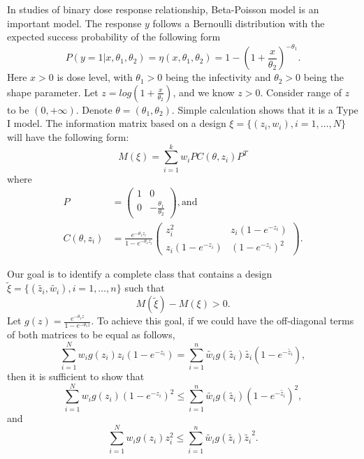 \documentclass[11pt]{amsart}
\theoremstyle{definition}
\theoremstyle{remark}
\numberwithin{equation}{section}
\begin{document}
In  studies of binary dose response relationship, Beta-Poisson model is an important model. The response $y$ follows a Bernoulli distribution with the expected success probability of the following form
\[
P(y=1|x,\theta_1,\theta_2) = \eta(x,\theta_1,\theta_2)= 1-(1+\frac{x}{\theta_2})^{-\theta_1}.
\]
 Here $x> 0$ is dose level, with $\theta_1>0$ being the infectivity and $\theta_2>0$ being the shape parameter. Let $z = log(1+\frac{x}{\theta_2})$, and we know $z>0$. Consider range of $z$ to be $(0,+\infty)$. Denote $\theta = (\theta_1,\theta_2)$. Simple calculation shows that it is a Type I model. The information matrix based on a design $\xi = \{(z_i,w_i), i=1,\ldots,N\}$ will have the following form: \begin{equation}
M(\xi) = \sum_{i=1}^{k} w_iP C(\theta,z_i)P^T 
\end{equation} where \begin{align*}
    P &= \left( \begin{array}{cc}
1 & 0\\
0 & -\frac{\theta_1}{\theta_2}
\end{array} \right), \text{and}\\ 
C(\theta,z_i) &= \frac{e^{-\theta_1z_i}}{1-e^{-\theta_1z_i}}\left( \begin{array}{cc}
z_i^2 & z_i(1-e^{-z_i})\\
z_i(1-e^{-z_i}) & (1-e^{-z_i})^2
\end{array} \right).
\end{align*} 

Our goal is to identify a complete class that contains a design $\tilde{\xi} = \{(\tilde{z_i},\tilde{w_i}), i=1,\ldots,n\}$ such that \[M(\tilde{\xi})-M(\xi)>0.\] Let $g(z) = \frac{e^{-\theta_1z}}{1-e^{-\theta_1z}}$. To achieve this goal, if we could have the off-diagonal terms of both matrices to be equal as follows,
\begin{equation}\label{eq: beta2_eq1}
\sum_{i=1}^{N} w_i g(z_i)z_i(1-e^{-z_i}) = \sum_{i=1}^{n} \tilde{w_i}  g(\tilde{z_i}) \tilde{z_i}(1-e^{-\tilde{z_i}}),
\end{equation}
then it is sufficient to show that 
\begin{equation}\label{eq: beta2_eq2}
\sum_{i=1}^{N} w_i  g(z_i)(1-e^{-z_i})^2 \le \sum_{i=1}^{n} \tilde{w_i} g(\tilde{z_i}) (1-e^{-\tilde{z_i}})^2,
\end{equation}
and
\begin{equation}\label{eq: beta2_eq3}
\sum_{i=1}^{N} w_i g(z_i)z_i^2 \le \sum_{i=1}^{n} \tilde{w_i}g(\tilde{z_i})\tilde{z_i}^2.
\end{equation} 
\end{document}
